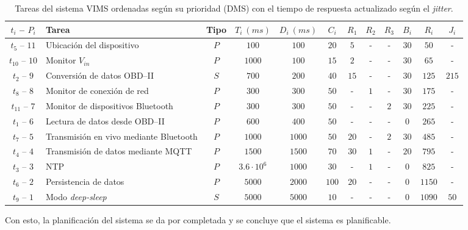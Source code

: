 \begin{table}[H]
  \centering
  \begin{tabularx}{\linewidth}{c|X|c|c|c|c|c|c|c|c|c|c}
    $t_i$ -- $P_i$   & \textbf{Tarea}                         & \textbf{Tipo} & $T_i~\left(ms\right)$ & $D_i~\left(ms\right)$ & $C_i$ & $R_1$ & $R_2$ & $R_3$ & $B_i$ & $R_i$  & $J_i$ \\
    \hline\hline
    $t_{5}$ -- $11$  & Ubicación del dispositivo              & $P$           & $100$                 & $100$                 & $20$  & $5$   & -     & -     & $30$  & $50$   & -     \\
    $t_{10}$ -- $10$ & Monitor $V_{in}$                       & $P$           & $1000$                & $100$                 & $15$  & $2$   & -     & -     & $30$  & $65$   & -     \\
    $t_{2}$ -- $9$   & Conversión de datos \ac{OBD}--II       & $S$           & $700$                 & $200$                 & $40$  & $15$  & -     & -     & $30$  & $125$  & $215$ \\
    $t_{8}$ -- $8$   & Monitor de conexión de red             & $P$           & $300$                 & $300$                 & $50$  & -     & $1$   & -     & $30$  & $175$  & -     \\
    $t_{11}$ -- $7$  & Monitor de dispositivos Bluetooth      & $P$           & $300$                 & $300$                 & $50$  & -     & -     & $2$   & $30$  & $225$  & -     \\
    $t_{1}$ -- $6$   & Lectura de datos desde \ac{OBD}--II    & $P$           & $600$                 & $400$                 & $50$  & -     & -     & -     & $0$   & $265$  & -     \\
    $t_{7}$ -- $5$   & Transmisión en vivo mediante Bluetooth & $P$           & $1000$                & $1000$                & $50$  & $20$  & -     & $2$   & $30$  & $485$  & -     \\
    $t_{4}$ -- $4$   & Transmisión de datos mediante MQTT     & $P$           & $1500$                & $1500$                & $70$  & $30$  & $1$   & -     & $20$  & $795$  & -     \\
    $t_{3}$ -- $3$   & NTP                                    & $P$           & $3.6 \cdot 10^6$      & $1000$                & $30$  & -     & $1$   & -     & $0$   & $825$  & -     \\
    $t_{6}$ -- $2$   & Persistencia de datos                  & $P$           & $5000$                & $2000$                & $100$ & $20$  & -     & -     & $0$   & $1150$ & -     \\
    $t_{9}$ -- $1$   & Modo \textit{deep-sleep}               & $S$           & $5000$                & $5000$                & $10$  & -     & -     & -     & $0$   & $1090$ & $50$  \\
    \hline
  \end{tabularx}
  \caption{Tareas del sistema \ac{VIMS} ordenadas según su prioridad (\ac{DMS}) con el tiempo de respuesta actualizado según el \textit{jitter}.}
  \label{tab:rt-table-rta-jitter}
\end{table}

Con esto, la planificación del sistema se da por completada y se concluye que el sistema
es planificable.
